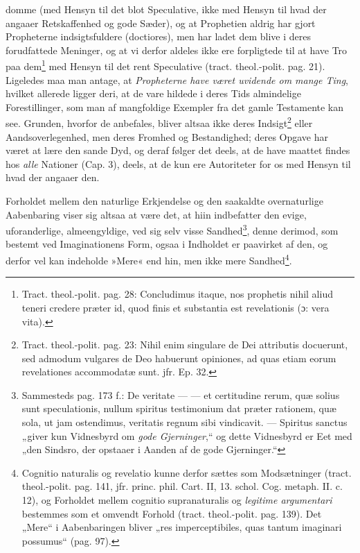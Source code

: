 \documentclass[12pt,a4paper]{book}
\begin{document}
domme (med Hensyn til det blot Speculative, ikke med Hensyn til hvad der angaaer Retskaffenhed og gode Sæder), og at Prophetien aldrig har gjort Propheterne indsigtsfuldere (doctiores), men har ladet dem blive i deres forudfattede Meninger, og at vi derfor aldeles ikke ere forpligtede til at have Tro paa dem\footnote{Tract. theol.-polit. pag. 28: Concludimus itaque, nos prophetis nihil aliud teneri credere præter id, quod finis et substantia est revelationis (ɔ: vera vita).} med Hensyn til det rent Speculative (tract. theol.-polit. pag. 21). Ligeledes maa man antage, at \emph{Propheterne have været uvidende om mange Ting}, hvilket allerede ligger deri, at de vare hildede i deres Tids almindelige Forestillinger, som man af mangfoldige Exempler fra det gamle Testamente kan see. Grunden, hvorfor de anbefales, bliver altsaa ikke deres Indsigt\footnote{Tract. theol.-polit. pag. 23: Nihil enim singulare de Dei attributis docuerunt, sed admodum vulgares de Deo habuerunt opiniones, ad quas etiam eorum revelationes accommodatæ sunt. jfr. Ep. 32.} eller Aandsoverlegenhed, men deres Fromhed og Bestandighed; deres Opgave har været at lære den sande Dyd, og deraf følger det deels, at de have maattet findes hos \emph{alle} Nationer (Cap. 3), deels, at de kun ere Autoriteter for os med Hensyn til hvad der angaaer den.

Forholdet mellem den naturlige Erkjendelse og den saakaldte overnaturlige Aabenbaring viser sig altsaa at være det, at hiin indbefatter den evige, uforanderlige, almeengyldige, ved sig selv visse Sandhed\footnote{Sammesteds pag. 173 f.: De veritate --- --- et certitudine rerum, quæ solius sunt speculationis, nullum spiritus testimonium dat præter rationem, quæ sola, ut jam
ostendimus, veritatis regnum sibi vindicavit. --- Spiritus sanctus „giver kun Vidnesbyrd om \emph{gode Gjerninger},“ og dette Vidnesbyrd er Eet med „den Sindsro, der opstaaer i Aanden af de gode Gjerninger.“}, denne derimod, som bestemt ved Imaginationens Form, ogsaa i Indholdet er paavirket af den, og derfor vel kan indeholde »Mere« end hin, men ikke mere Sandhed\footnote{%
Cognitio naturalis og revelatio kunne derfor sættes som Modsætninger (tract. theol.-polit. pag. 141, jfr. princ. phil. Cart. II, 13. schol. Cog. metaph. II. c. 12), og Forholdet mellem cognitio supranaturalis og \emph{legitime argumentari} bestemmes som et omvendt Forhold (tract. theol.-polit. pag. 139). Det „Mere“ i Aabenbaringen bliver „res imperceptibiles, quas tantum imaginari possumus“ (pag. 97).}.
\end{document}

